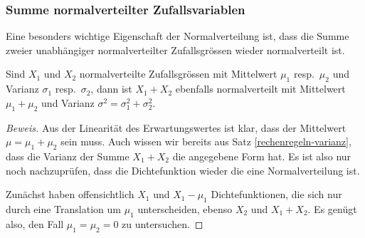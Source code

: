 \subsubsection{Summe normalverteilter Zufallsvariablen}

Eine besonders wichtige Eigenschaft der Normalverteilung ist, dass die
Summe zweier unabhängiger normalverteilter Zufallsgrössen wieder normalverteilt
ist.
\begin{satz}
Sind $X_1$ und $X_2$ normalverteilte Zufallsgrössen mit Mittelwert $\mu_1$
resp.~$\mu_2$ und Varianz $\sigma_1$ resp.~$\sigma_2$, dann ist
$X_1+X_2$ ebenfalls normalverteilt mit Mittelwert $\mu_1+\mu_2$ und
Varianz $\sigma^2=\sigma_1^2+\sigma_2^2$.
\end{satz}
\begin{proof}[Beweis]
Aus der Linearität des Erwartungswertes ist klar, dass der Mittelwert
$\mu=\mu_1+\mu_2$ sein muss.
Auch wissen wir bereits aus Satz \ref{rechenregeln-varianz}, dass
die Varianz der Summe $X_1+X_2$ die angegebene Form hat.
Es ist also nur
noch nachzuprüfen, dass die Dichtefunktion wieder die eine Normalverteilung
ist.

Zunächst haben offensichtlich $X_1$ und $X_1-\mu_1$ Dichtefunktionen,
die sich nur durch eine Translation um $\mu_1$  unterscheiden, ebenso
$X_2$ und $X_1+X_2$.
Es genügt also, den Fall $\mu_1=\mu_2=0$ zu untersuchen.


\end{proof}
